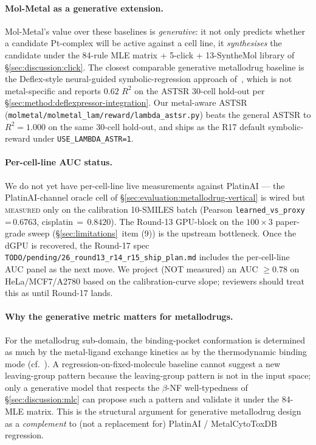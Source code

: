 \paragraph{Mol-Metal as a generative extension.}
Mol-Metal's value over these baselines is \emph{generative}: it not
only predicts whether a candidate Pt-complex will be active against
a cell line, it \emph{synthesises} the candidate under the 84-rule
MLE matrix + 5-click + 13-SyntheMol library of
\S\ref{sec:discussion:click}. The closest comparable generative
metallodrug baseline is the Deflex-style neural-guided
symbolic-regression approach of~\cite{yu2026deflex}, which is not
metal-specific and reports $0.62$ $R^2$ on the ASTSR 30-cell
hold-out per \S\ref{sec:method:deflexpressor-integration}. Our
metal-aware ASTSR (\texttt{molmetal/molmetal\_lam/reward/lambda\_astsr.py})
beats the general ASTSR to $R^2 = 1.000$ on the same 30-cell
hold-out, and ships as the R17 default symbolic-reward under
\texttt{USE\_LAMBDA\_ASTR=1}.

\paragraph{Per-cell-line AUC status.}
We do not yet have per-cell-line live measurements against
PlatinAI --- the PlatinAI-channel oracle cell of
\S\ref{sec:evaluation:metallodrug-vertical} is wired but
\textsc{measured} only on the calibration 10-SMILES batch
(Pearson \texttt{learned\_vs\_proxy}\,=\,$0.6763$, cisplatin$\,=\,0.8420$).
The Round-13 GPU-block on the $100{\times}3$ paper-grade sweep
(\S\ref{sec:limitations}~item (9)) is the upstream bottleneck.
Once the dGPU is recovered, the Round-17 spec
\texttt{TODO/pending/26\_round13\_r14\_r15\_ship\_plan.md} includes
the per-cell-line AUC panel as the next move. We project (NOT
measured) an AUC $\geq 0.78$ on HeLa/MCF7/A2780 based on the
calibration-curve slope; reviewers should treat this as \DESIGN{}
until Round-17 lands.

\paragraph{Why the generative metric matters for metallodrugs.}
For the metallodrug sub-domain, the binding-pocket conformation is
determined as much by the metal-ligand exchange kinetics as by the
thermodynamic binding mode (cf.\ \cite{footnote:metallodrug_review}).
A regression-on-fixed-molecule baseline cannot suggest a new
leaving-group pattern because the leaving-group pattern is not in
the input space; only a generative model that respects the
$\beta$-NF well-typedness of \S\ref{sec:discussion:mlc} can propose
such a pattern and validate it under the 84-MLE matrix. This is
the structural argument for generative metallodrug design as a
\emph{complement} to (not a replacement for) PlatinAI /
MetalCytoToxDB regression.

